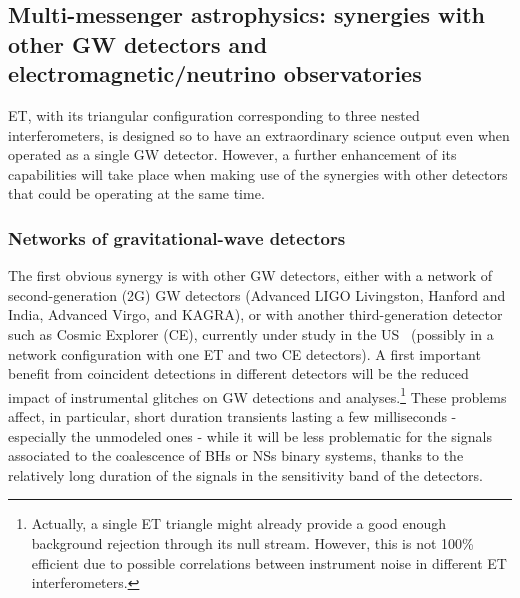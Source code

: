\subsection{Multi-messenger astrophysics: synergies with other GW detectors and electromagnetic/neutrino observatories}
\label{sec:MM}


ET, with its triangular configuration corresponding to three nested interferometers, is designed so to have an extraordinary science output even when operated as a single GW detector. However, a further enhancement of its capabilities will take place when making use of  the synergies with other detectors that could be operating at the same time.

\subsubsection{Networks of  gravitational-wave detectors}\label{sect:net3G}

The first obvious synergy is with other GW detectors, either with a network of second-generation (2G) GW detectors (Advanced LIGO Livingston, Hanford and India, Advanced Virgo, and KAGRA),  
or with another
third-generation detector such as  Cosmic Explorer (CE), currently under study in the US~\cite{Dwyer:2014fpa,Reitze:2019iox} (possibly in a network configuration with one ET and two CE detectors).   A first important benefit from coincident detections in different detectors
will be the reduced impact of instrumental glitches on GW detections and analyses.\footnote{Actually, a single ET triangle might already provide a good enough background rejection through its null stream. However,  this is not 100\% efficient due to possible correlations between instrument noise in different ET interferometers.}
These problems affect, in particular, short duration transients lasting a few milliseconds - especially the unmodeled ones - while it will be less problematic for the signals associated to the coalescence of BHs or NSs binary systems, thanks to the relatively long duration of the signals in the sensitivity band of the detectors.


